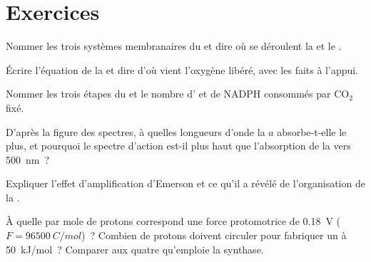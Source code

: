 \section{Exercices}

\begin{exercise}[$\star$]\label{exo:b1:photosynthesis:1}
Nommer les trois systèmes membranaires du  et dire où se
déroulent la  et le .
\end{exercise}

\begin{exercise}[$\star$]\label{exo:b1:photosynthesis:2}
Écrire l'équation de la  et dire d'où vient l'oxygène
libéré, avec les faits à l'appui.
\end{exercise}

\begin{exercise}[$\star$]\label{exo:b1:photosynthesis:3}
Nommer les trois étapes du  et le nombre d' et de
NADPH consommés par $\mathrm{CO_2}$ fixé.
\end{exercise}

\begin{exercise}[$\star$]\label{exo:b1:photosynthesis:4}
D'après la figure des spectres, à quelles longueurs d'onde la
 $a$ absorbe-t-elle le plus, et pourquoi le spectre d'action
est-il plus haut que l'absorption de la  vers
\qty{500}{nm}~?
\end{exercise}

\begin{exercise}[$\star\star$]\label{exo:b1:photosynthesis:5}
Expliquer l'effet d'amplification d'Emerson et ce qu'il a révélé de
l'organisation de la .
\end{exercise}

\begin{exercise}[$\star\star$]\label{exo:b1:photosynthesis:6}
À quelle  par mole de protons correspond une force
protomotrice de \qty{0.18}{V} ($F = \qty{96500}{C/mol}$)~? Combien de
protons doivent circuler pour fabriquer un  à \qty{50}{kJ/mol}~?
Comparer aux quatre qu'emploie la synthase.
\end{exercise}

